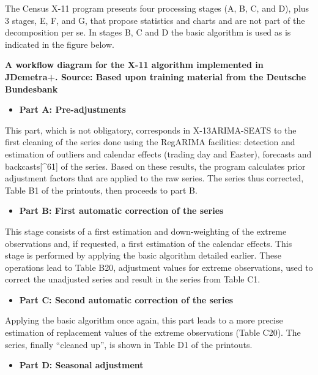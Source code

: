 \documentclass[
  letterpaper,
  DIV=11,
  numbers=noendperiod]{scrreprt}
\providecommand{\tightlist}{%
  \setlength{\itemsep}{0pt}\setlength{\parskip}{0pt}}\usepackage{longtable,booktabs,array}
\begin{document}
The Census X-11 program presents four processing stages (A, B, C, and
D), plus 3 stages, E, F, and G, that propose statistics and charts and
are not part of the decomposition per se. In stages B, C and D the basic
algorithm is used as is indicated in the figure below.

\textbf{A workflow diagram for the X-11 algorithm implemented in
JDemetra+. Source: Based upon training material from the Deutsche
Bundesbank}

\begin{itemize}
\tightlist
\item
  \textbf{Part A: Pre-adjustments}
\end{itemize}

This part, which is not obligatory, corresponds in X-13ARIMA-SEATS to
the first cleaning of the series done using the RegARIMA facilities:
detection and estimation of outliers and calendar effects (trading day
and Easter), forecasts and backcasts{[}\^{}61{]} of the series. Based on
these results, the program calculates prior adjustment factors that are
applied to the raw series. The series thus corrected, Table B1 of the
printouts, then proceeds to part B.

\begin{itemize}
\tightlist
\item
  \textbf{Part B: First automatic correction of the series}
\end{itemize}

This stage consists of a first estimation and down-weighting of the
extreme observations and, if requested, a first estimation of the
calendar effects. This stage is performed by applying the basic
algorithm detailed earlier. These operations lead to Table B20,
adjustment values for extreme observations, used to correct the
unadjusted series and result in the series from Table C1.

\begin{itemize}
\tightlist
\item
  \textbf{Part C: Second automatic correction of the series}
\end{itemize}

Applying the basic algorithm once again, this part leads to a more
precise estimation of replacement values of the extreme observations
(Table C20). The series, finally ``cleaned up'', is shown in Table D1 of
the printouts.

\begin{itemize}
\tightlist
\item
  \textbf{Part D: Seasonal adjustment}
\end{itemize}
\end{document}
